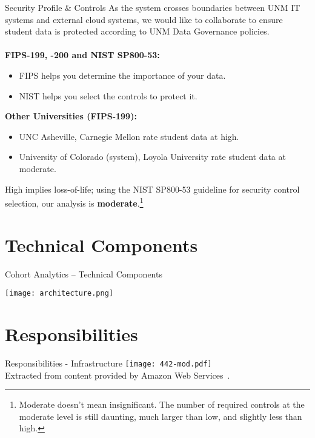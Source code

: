 \documentclass[t,handout]{beamer}   %
\begin{document}
\begin{frame}{Security Profile \& Controls}%
\vspace*{-0.25in}
As the system crosses boundaries between UNM IT systems and external cloud systems, we would like to collaborate to ensure student data is protected according to UNM Data Governance policies.~\\~\\
\pause
\textbf{FIPS-199, -200 and NIST SP800-53:}
{\small
\begin{itemize}
\item FIPS helps you determine the importance of your data. 
\item NIST helps you select the controls to protect it.
\end{itemize}
}
\pause
\textbf{Other Universities (FIPS-199):}%
\begin{itemize}
\item UNC Asheville, Carnegie Mellon rate student data at high.
\item University of Colorado (system), Loyola University rate student data at moderate.
\end{itemize}
\pause
\vspace*{0.1in}
High implies loss-of-life; using the NIST SP800-53 guideline for security control selection, our analysis is {\bf moderate}.\footnote{Moderate doesn't mean insignificant. The number of required controls at the moderate level is still daunting, much larger than low, and slightly less than high.}
\end{frame}

\section{Technical Components}%
\begin{frame}{Cohort Analytics -- Technical Components}
\vspace*{0.25in}
  \centerline{\texttt{[image: architecture.png]}}
\end{frame}

\section{Responsibilities}%
\begin{frame}{Responsibilities - Infrastructure}
 	\texttt{[image: 442-mod.pdf]} \\
 	{\tiny Extracted from content provided by Amazon Web Services~.}
\end{frame}
\end{document}
